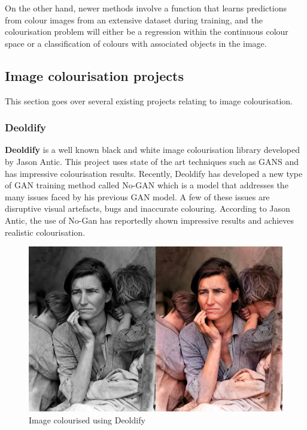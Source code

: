 On the other hand, newer methods involve a function that learns predictions from colour images from an extensive dataset during training, and the colourisation problem will either be a regression within the continuous colour space or a classification of colours with associated objects in the image. 




\subsection{Image colourisation projects}
This section goes over several existing projects relating to image colourisation.
\subsubsection*{Deoldify}
\textbf{Deoldify} is a well known black and white image colourisation library developed by Jason Antic\cite{jantic}. This project uses state of the art techniques such as GANS and has impressive colourisation results. Recently, Deoldify has developed a new type of GAN training method called No-GAN which is a model that addresses the many issues faced by his previous GAN model. A few of these issues are disruptive visual artefacts, bugs and inaccurate colouring. According to Jason Antic, the use of No-Gan has reportedly shown impressive results and achieves realistic colourisation.
\begin{figure}[H]
    \centering
    \includegraphics[width=0.7\columnwidth]{sections/figures/deoldify.jpg}
    \caption{Image colourised using Deoldify}
    \label{fig:my_label}
\end{figure}


